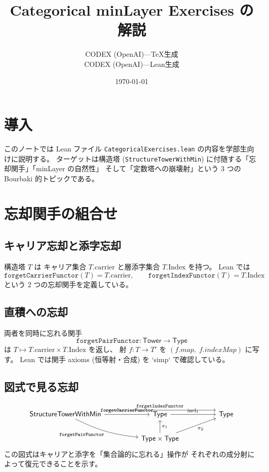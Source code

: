 \documentclass[a4paper]{ltjsarticle}
\title{Categorical minLayer Exercises の解説}
\author{CODEX (OpenAI)---TeX生成 \\ CODEX (OpenAI)---Lean生成}
\date{\today}
\begin{document}
\maketitle

\section*{導入}
このノートでは Lean ファイル \texttt{CategoricalExercises.lean} の内容を学部生向けに説明する。
ターゲットは構造塔 (\texttt{StructureTowerWithMin}) に付随する「忘却関手」「minLayer の自然性」
そして「定数塔への崩壊射」という 3 つの Bourbaki 的トピックである。

\section{忘却関手の組合せ}
\subsection{キャリア忘却と添字忘却}
構造塔 $T$ は
キャリア集合 $T.\mathrm{carrier}$ と層添字集合 $T.\mathrm{Index}$ を持つ。
Lean では
\[
  \texttt{forgetCarrierFunctor}(T) = T.\mathrm{carrier}, \qquad
  \texttt{forgetIndexFunctor}(T) = T.\mathrm{Index}
\]
という 2 つの忘却関手を定義している。

\subsection{直積への忘却}
両者を同時に忘れる関手
\[
  \texttt{forgetPairFunctor} : \mathsf{Tower} \to \mathsf{Type}
\]
は $T \mapsto T.\mathrm{carrier} \times T.\mathrm{Index}$ を返し、
射 $f : T \to T'$ を $(f.map,\; f.indexMap)$ に写す。
Lean では関手 axioms (恒等射・合成) を `simp` で確認している。

\subsection{図式で見る忘却}
\[
\begin{tikzcd}[column sep=huge]
  \mathsf{StructureTowerWithMin}
    \arrow[r, "\texttt{forgetCarrierFunctor}"]
    \arrow[dr, "\texttt{forgetPairFunctor}"', bend right=10]
    \arrow[rr, shift left=0.6em, "\texttt{forgetIndexFunctor}"]
  & \mathsf{Type}
    \arrow[r, "\text{incl}_1"]
  & \mathsf{Type}
  \\
  & \mathsf{Type} \times \mathsf{Type}
    \arrow[u, "\pi_1"']
    \arrow[ur, "\pi_2"']
\end{tikzcd}
\]
この図式はキャリアと添字を「集合論的に忘れる」操作が
それぞれの成分射によって復元できることを示す。
\end{document}
